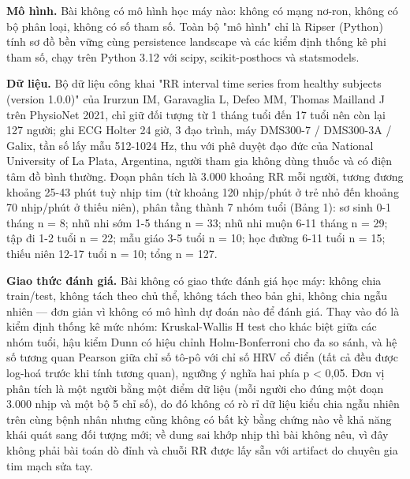 \documentclass[12pt,a4paper]{article}
\begin{document}
\noindent \textbf{Mô hình.} Bài không có mô hình học máy nào: không có mạng nơ-ron, không có bộ phân loại, không có số tham số. Toàn bộ "mô hình" chỉ là Ripser (Python) tính sơ đồ bền vững cùng persistence landscape và các kiểm định thống kê phi tham số, chạy trên Python 3.12 với scipy, scikit-posthocs và statsmodels.\par\vspace{3pt}
\noindent \textbf{Dữ liệu.} Bộ dữ liệu công khai "RR interval time series from healthy subjects (version 1.0.0)" của Irurzun IM, Garavaglia L, Defeo MM, Thomas Mailland J trên PhysioNet 2021, chỉ giữ đối tượng từ 1 tháng tuổi đến 17 tuổi nên còn lại 127 người; ghi ECG Holter 24 giờ, 3 đạo trình, máy DMS300-7 / DMS300-3A / Galix, tần số lấy mẫu 512-1024 Hz, thu với phê duyệt đạo đức của National University of La Plata, Argentina, người tham gia không dùng thuốc và có điện tâm đồ bình thường. Đoạn phân tích là 3.000 khoảng RR mỗi người, tương đương khoảng 25-43 phút tuỳ nhịp tim (từ khoảng 120 nhịp/phút ở trẻ nhỏ đến khoảng 70 nhịp/phút ở thiếu niên), phân tầng thành 7 nhóm tuổi (Bảng 1): sơ sinh 0-1 tháng n = 8; nhũ nhi sớm 1-5 tháng n = 33; nhũ nhi muộn 6-11 tháng n = 29; tập đi 1-2 tuổi n = 22; mẫu giáo 3-5 tuổi n = 10; học đường 6-11 tuổi n = 15; thiếu niên 12-17 tuổi n = 10; tổng n = 127.\par\vspace{3pt}
\noindent \textbf{Giao thức đánh giá.} Bài không có giao thức đánh giá học máy: không chia train/test, không tách theo chủ thể, không tách theo bản ghi, không chia ngẫu nhiên — đơn giản vì không có mô hình dự đoán nào để đánh giá. Thay vào đó là kiểm định thống kê mức nhóm: Kruskal-Wallis H test cho khác biệt giữa các nhóm tuổi, hậu kiểm Dunn có hiệu chỉnh Holm-Bonferroni cho đa so sánh, và hệ số tương quan Pearson giữa chỉ số tô-pô với chỉ số HRV cổ điển (tất cả đều được log-hoá trước khi tính tương quan), ngưỡng ý nghĩa hai phía p < 0,05. Đơn vị phân tích là một người bằng một điểm dữ liệu (mỗi người cho đúng một đoạn 3.000 nhịp và một bộ 5 chỉ số), do đó không có rò rỉ dữ liệu kiểu chia ngẫu nhiên trên cùng bệnh nhân nhưng cũng không có bất kỳ bằng chứng nào về khả năng khái quát sang đối tượng mới; về dung sai khớp nhịp thì bài không nêu, vì đây không phải bài toán dò đỉnh và chuỗi RR được lấy sẵn với artifact do chuyên gia tim mạch sửa tay.\par\vspace{3pt}
\end{document}
